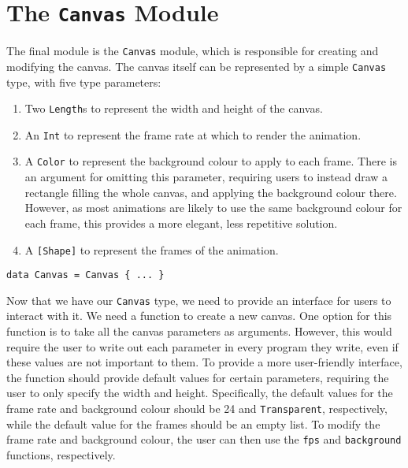 \documentclass[../main.tex]{subfiles}
\begin{document}
    \section{The \texttt{Canvas}
        Module} The final module is the \texttt{Canvas} module, which is responsible
            for creating and modifying the canvas.
        The canvas itself can be represented by a simple \texttt{Canvas} type, with five type parameters:
        \begin{enumerate}
            \item Two \texttt{Length}s to represent the width and height of the canvas.
            \item An \texttt{Int} to represent the frame rate at which to render the animation.
            \item A \texttt{Color} to represent the background colour to apply to each frame.
                  There is an argument for omitting this parameter, requiring users to instead
                      draw a rectangle filling the whole canvas, and applying the background colour
                      there.
                  However, as most animations are likely to use the same background colour for
                      each frame, this provides a more elegant, less repetitive solution.
            \item A \texttt{[Shape]} to represent the frames of the animation.
        \end{enumerate}

        \begin{lstlisting}[label={lst:canvas}, caption={The \texttt{Canvas} type definition.}]
data Canvas = Canvas { ... }\end{lstlisting}

        Now that we have our \texttt{Canvas} type, we need to provide an interface for
            users to interact with it.
        We need a function to create a new canvas.
        One option for this function is to take all the canvas parameters as arguments.
        However, this would require the user to write out each parameter in every
            program they write, even if these values are not important to them.
        To provide a more user-friendly interface, the function should provide default
            values for certain parameters, requiring the user to only specify the width and
            height.
        Specifically, the default values for the frame rate and background colour
            should be 24 and \texttt{Transparent}, respectively, while the default value
            for the frames should be an empty list.
        To modify the frame rate and background colour, the user can then use the
            \texttt{fps} and \texttt{background} functions, respectively.
\end{document}
